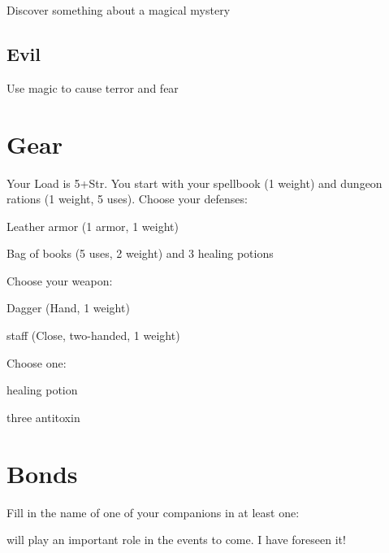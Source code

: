 Discover something about a magical mystery

 
\subsection{Evil}   
 

Use magic to cause terror and fear



 
\section{Gear}   
 



Your Load is 5+Str. You start with your spellbook (1 weight) and dungeon rations (1 weight, 5 uses). Choose your defenses:

 
\startitemize[1,packed]

\item Leather armor (1 armor, 1 weight)

 
\item Bag of books (5 uses, 2 weight) and 3 healing potions


\stopitemize
 

Choose your weapon:

 
\startitemize[1,packed]

\item Dagger (Hand, 1 weight)

 
\item staff (Close, two-handed, 1 weight)


\stopitemize
 

Choose one:

 
\startitemize[1,packed]

\item healing potion

 
\item three antitoxin


\stopitemize


 
\section{Bonds}   
 



Fill in the name of one of your companions in at least one:

 

\thinrules[2] will play an important role in the events to come. I have foreseen it!

